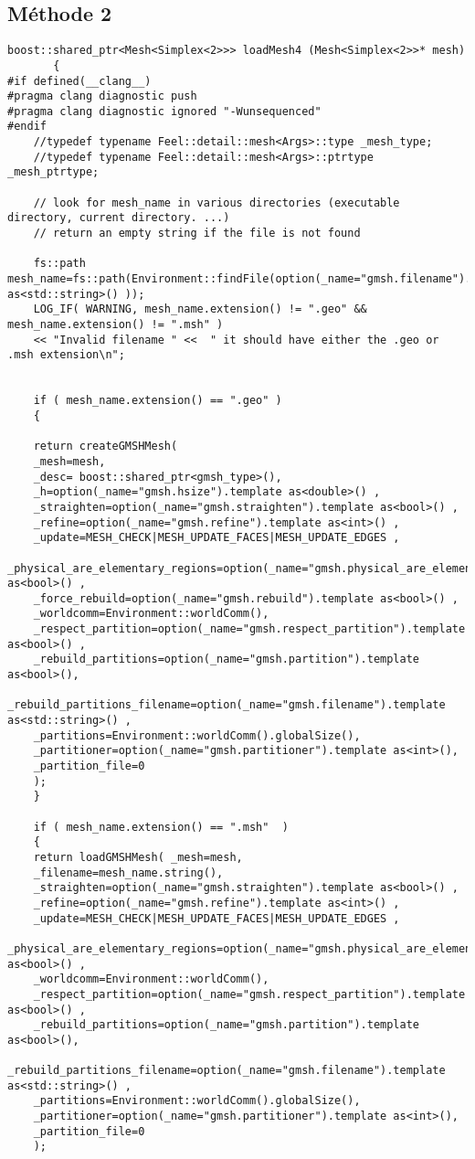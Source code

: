 \documentclass[12pt]{article}
\begin{document}
\subsection{Méthode 2}
\begin{lstlisting}
boost::shared_ptr<Mesh<Simplex<2>>> loadMesh4 (Mesh<Simplex<2>>* mesh)
       {
#if defined(__clang__)
#pragma clang diagnostic push
#pragma clang diagnostic ignored "-Wunsequenced"
#endif
    //typedef typename Feel::detail::mesh<Args>::type _mesh_type;
    //typedef typename Feel::detail::mesh<Args>::ptrtype _mesh_ptrtype;

    // look for mesh_name in various directories (executable directory, current directory. ...)
    // return an empty string if the file is not found

    fs::path mesh_name=fs::path(Environment::findFile(option(_name="gmsh.filename").template as<std::string>() ));
    LOG_IF( WARNING, mesh_name.extension() != ".geo" && mesh_name.extension() != ".msh" )
    << "Invalid filename " <<  " it should have either the .geo or .msh extension\n";


    if ( mesh_name.extension() == ".geo" )
    {

    return createGMSHMesh(
    _mesh=mesh,
    _desc= boost::shared_ptr<gmsh_type>(),
    _h=option(_name="gmsh.hsize").template as<double>() ,
    _straighten=option(_name="gmsh.straighten").template as<bool>() ,
    _refine=option(_name="gmsh.refine").template as<int>() ,
    _update=MESH_CHECK|MESH_UPDATE_FACES|MESH_UPDATE_EDGES ,
    _physical_are_elementary_regions=option(_name="gmsh.physical_are_elementary_regions").template as<bool>() ,
    _force_rebuild=option(_name="gmsh.rebuild").template as<bool>() ,
    _worldcomm=Environment::worldComm(),
    _respect_partition=option(_name="gmsh.respect_partition").template as<bool>() ,
    _rebuild_partitions=option(_name="gmsh.partition").template as<bool>(),
    _rebuild_partitions_filename=option(_name="gmsh.filename").template as<std::string>() ,
    _partitions=Environment::worldComm().globalSize(),
    _partitioner=option(_name="gmsh.partitioner").template as<int>(),
    _partition_file=0           
    );
    }

    if ( mesh_name.extension() == ".msh"  )
    {
    return loadGMSHMesh( _mesh=mesh,
    _filename=mesh_name.string(),
    _straighten=option(_name="gmsh.straighten").template as<bool>() ,
    _refine=option(_name="gmsh.refine").template as<int>() ,
    _update=MESH_CHECK|MESH_UPDATE_FACES|MESH_UPDATE_EDGES ,
    _physical_are_elementary_regions=option(_name="gmsh.physical_are_elementary_regions").template as<bool>() ,
    _worldcomm=Environment::worldComm(),
    _respect_partition=option(_name="gmsh.respect_partition").template as<bool>() ,
    _rebuild_partitions=option(_name="gmsh.partition").template as<bool>(),
    _rebuild_partitions_filename=option(_name="gmsh.filename").template as<std::string>() ,
    _partitions=Environment::worldComm().globalSize(),
    _partitioner=option(_name="gmsh.partitioner").template as<int>(),
    _partition_file=0   
    );


\end{lstlisting}
\end{document}
